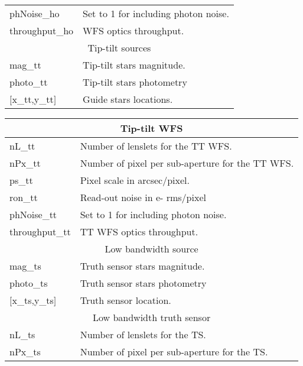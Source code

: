 \documentclass[12pt]{article}
\begin{document}
\begin{table}[H]
\begin{scriptsize}
\begin{tabular}{p{2.25cm}p{5cm}}
		phNoise\_ho      & Set to 1 for including photon noise.\\                                
		throughput\_ho       & WFS optics throughput.\\  
			\hline
		\multicolumn{2}{c}{Tip-tilt sources} \\
		\hline
		mag\_tt               & Tip-tilt stars magnitude.\\                                 
		photo\_tt             & Tip-tilt stars photometry \\                      
		$[$x\_tt,y\_tt$]$            & Guide stars locations.\\                             	                                                    					
	\end{tabular}
\begin{tabular}{p{2.5cm}p{7cm}}			                              
	\hline
	\multicolumn{2}{c}{Tip-tilt WFS} \\
	\hline
	nL\_tt               & Number of lenslets for the TT WFS.\\                                       
	nPx\_tt              & Number of pixel per sub-aperture for the TT WFS.\\                               
	ps\_tt         & Pixel scale in arcsec/pixel.\\                     
	ron\_tt    & Read-out noise in e- rms/pixel\\                               
	phNoise\_tt     & Set to 1 for including photon noise.\\                             
	throughput\_tt         & TT WFS optics throughput.\\      	                          
	\hline
	\multicolumn{2}{c}{Low bandwidth source} \\
	\hline
	mag\_ts               & Truth sensor stars magnitude.\\                                 
	photo\_ts             & Truth sensor stars photometry \\                      
	$[$x\_ts,y\_ts$]$            & Truth sensor location.\\                                          
	\hline
	\multicolumn{2}{c}{Low bandwidth truth sensor} \\
	\hline
	nL\_ts               & Number of lenslets for the TS.\\                                       
	nPx\_ts              & Number of pixel per sub-aperture for the TS.\\                                 	

\end{tabular}
\end{scriptsize}
\end{table}
\end{document}
